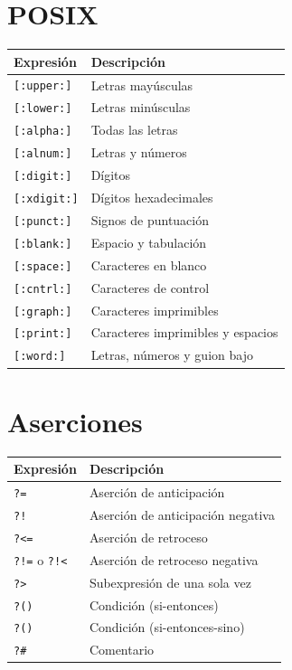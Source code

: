 \documentclass[
  letterpaper,
  DIV=11,
  numbers=noendperiod]{scrreprt}
\begin{document}
\chapter{POSIX}\label{posix}

\begin{longtable}[]{@{}ll@{}}
\toprule\noalign{}
Expresión & Descripción \\
\midrule\noalign{}
\endhead
\bottomrule\noalign{}
\endlastfoot
\texttt{{[}:upper:{]}} & Letras mayúsculas \\
\texttt{{[}:lower:{]}} & Letras minúsculas \\
\texttt{{[}:alpha:{]}} & Todas las letras \\
\texttt{{[}:alnum:{]}} & Letras y números \\
\texttt{{[}:digit:{]}} & Dígitos \\
\texttt{{[}:xdigit:{]}} & Dígitos hexadecimales \\
\texttt{{[}:punct:{]}} & Signos de puntuación \\
\texttt{{[}:blank:{]}} & Espacio y tabulación \\
\texttt{{[}:space:{]}} & Caracteres en blanco \\
\texttt{{[}:cntrl:{]}} & Caracteres de control \\
\texttt{{[}:graph:{]}} & Caracteres imprimibles \\
\texttt{{[}:print:{]}} & Caracteres imprimibles y espacios \\
\texttt{{[}:word:{]}} & Letras, números y guion bajo \\
\end{longtable}

\chapter{Aserciones}\label{aserciones}

\begin{longtable}[]{@{}ll@{}}
\toprule\noalign{}
Expresión & Descripción \\
\midrule\noalign{}
\endhead
\bottomrule\noalign{}
\endlastfoot
\texttt{?=} & Aserción de anticipación \\
\texttt{?!} & Aserción de anticipación negativa \\
\texttt{?\textless{}=} & Aserción de retroceso \\
\texttt{?!=} o \texttt{?!\textless{}} & Aserción de retroceso
negativa \\
\texttt{?\textgreater{}} & Subexpresión de una sola vez \\
\texttt{?()} & Condición (si-entonces) \\
\texttt{?()\textbar{}} & Condición (si-entonces-sino) \\
\texttt{?\#} & Comentario \\
\end{longtable}
\end{document}
